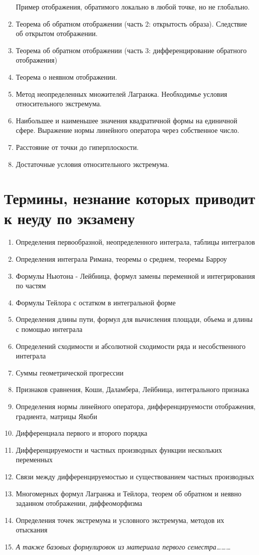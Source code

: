 \documentclass[12pt, a4paper]{article}
\begin{document}
\begin{enumerate}
    Пример отображения, обратимого локально в любой точке, но не глобально.
    \item Теорема об обратном отображении (часть 2: открытость образа). Следствие об открытом отображении.
    \item Теорема об обратном отображении (часть 3: дифференцирование обратного отображения)
    \item Теорема о неявном отображении.
    \item Метод неопределенных множителей Лагранжа. Необходимье условия относительного экстремума.
    \item Наибольшее и наименьшее значения квадратичной формы на единичной сфере. Выражение нормы линейного оператора через собственное число.
    \item Расстояние от точки до гиперплоскости.
    \item Достаточные условия относительного экстремума.
\end{enumerate}

\section{Термины, незнание которых приводит к неуду по экзамену}

\begin{enumerate}
    \item Определения первообразной, неопределенного интеграла, таблицы интегралов
    \item Определения интеграла Римана, теоремы о среднем, теоремы Барроу 
    \item Формулы Ньютона - Лейбница, формул замены переменной и интегрирования по частям
    \item Формулы Тейлора с остатком в интегральной форме
    \item Определения длины пути, формул для вычисления площади, объема и длины с помощью интеграла
    \item Определений сходимости и абсолютной сходимости ряда и несобственного интеграла
    \item Суммы геометрической прогрессии
    \item Признаков сравнения, Коши, Даламбера, Лейбница, интегрального признака
    \item Определения нормы линейного оператора, дифференцируемости отображения, градиента, матрицы Якоби
    \item Дифференциала первого и второго порядка
    \item Дифференцируемости и частных производных функции нескольких переменных
    \item Связи между дифференцируемостью и существованием частных производных
    \item Многомерных формул Лагранжа и Тейлора, теорем об обратном и неявно заданном отображении, диффеоморфизма
    \item Определения точек экстремума и условного экстремума, методов их отыскания
    \item \textit{А также базовых формулировок из материала первого семестра………}
\end{enumerate}
\end{document}
